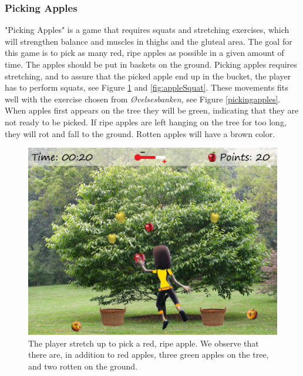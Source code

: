 \subsubsection{Picking Apples}
"Picking Apples" is a game that requires squats and stretching exercises, which will strengthen balance and muscles in thighs and the gluteal area. The goal for this game is to pick as many red, ripe apples as possible in a given amount of time. The apples should be put in baskets on the ground. Picking apples requires stretching, and to assure that the picked apple end up in the bucket, the player has to perform squats, see Figure \ref{fig:appleStretch} and \ref{fig:appleSquat}. These movements fits well with the exercise chosen from \emph{Øvelsesbanken}, see Figure \ref{pickingapples}. When apples first appears on the tree they will be green, indicating that they are not ready to be picked. If ripe apples are left hanging on the tree for too long, they will rot and fall to the ground. Rotten apples will have a brown color. 

\begin{figure} [H]
\centering
\includegraphics[scale=0.1]{gameappletreeEng.jpg}
\caption[Picking apples - stretching]{The player stretch up to pick a red, ripe apple. We observe that there are, in addition to red apples, three green apples on the tree, and two rotten on the ground.}
\label{fig:appleStretch}
\end{figure}

